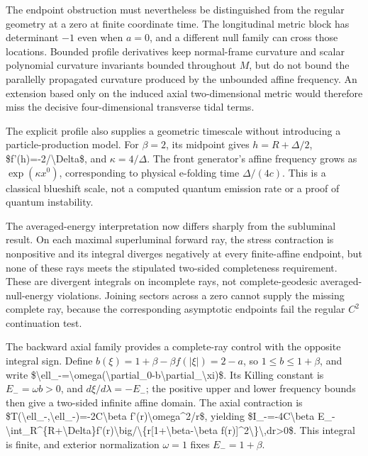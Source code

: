 \documentclass[11pt]{article}
\begin{document}
The endpoint obstruction must nevertheless be distinguished from the regular geometry at a zero at finite coordinate time. The longitudinal metric block has determinant $-1$ even when $a=0$, and a different null family can cross those locations. Bounded profile derivatives keep normal-frame curvature and scalar polynomial curvature invariants bounded throughout $M$, but do not bound the parallelly propagated curvature produced by the unbounded affine frequency. An extension based only on the induced axial two-dimensional metric would therefore miss the decisive four-dimensional transverse tidal terms.

The explicit profile also supplies a geometric timescale without introducing a particle-production model. For $\beta=2$, its midpoint gives $h=R+\Delta/2$, \$f'(h)=-2/\textbackslash{}Delta\$, and $\kappa=4/\Delta$. The front generator's affine frequency grows as $\exp(\kappa x^0)$, corresponding to physical e-folding time $\Delta/(4c)$. This is a classical blueshift scale, not a computed quantum emission rate or a proof of quantum instability.

The averaged-energy interpretation now differs sharply from the subluminal result. On each maximal superluminal forward ray, the stress contraction is nonpositive and its integral diverges negatively at every finite-affine endpoint, but none of these rays meets the stipulated two-sided completeness requirement. These are divergent integrals on incomplete rays, not complete-geodesic averaged-null-energy violations. Joining sectors across a zero cannot supply the missing complete ray, because the corresponding asymptotic endpoints fail the regular $C^2$ continuation test.

The backward axial family provides a complete-ray control with the opposite integral sign. Define $b(\xi)=1+\beta-\beta f(|\xi|)=2-a$, so $1\leq b\leq1+\beta$, and write \$\textbackslash{}ell\_-=\textbackslash{}omega(\textbackslash{}partial\_0-b\textbackslash{}partial\_\textbackslash{}xi)\$. Its Killing constant is $E_-=\omega b>0$, and $d\xi/d\lambda=-E_-$; the positive upper and lower frequency bounds then give a two-sided infinite affine domain. The axial contraction is \$T(\textbackslash{}ell\_-,\textbackslash{}ell\_-)=-2C\textbackslash{}beta f'(r)\textbackslash{}omega\textasciicircum{}2/r\$, yielding \$I\_-=-4C\textbackslash{}beta E\_-\textbackslash{}int\_R\textasciicircum{}\{R+\textbackslash{}Delta\}f'(r)\textbackslash{}big/\textbackslash{}\{r[1+\textbackslash{}beta-\textbackslash{}beta f(r)]\textasciicircum{}2\textbackslash{}\}\textbackslash{},dr\textgreater{}0\$. This integral is finite, and exterior normalization $\omega=1$ fixes $E_-=1+\beta$.
\end{document}
